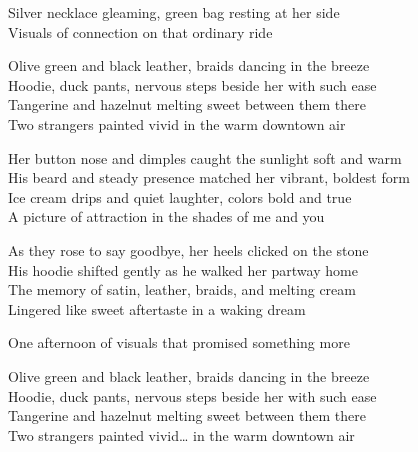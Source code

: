 \begin{lyrics}
Silver necklace gleaming, green bag resting at her side\\
Visuals of connection on that ordinary ride

Olive green and black leather, braids dancing in the breeze\\
Hoodie, duck pants, nervous steps beside her with such ease\\
Tangerine and hazelnut melting sweet between them there\\
Two strangers painted vivid in the warm downtown air

Her button nose and dimples caught the sunlight soft and warm\\
His beard and steady presence matched her vibrant, boldest form\\
Ice cream drips and quiet laughter, colors bold and true\\
A picture of attraction in the shades of me and you

As they rose to say goodbye, her heels clicked on the stone\\
His hoodie shifted gently as he walked her partway home\\
The memory of satin, leather, braids, and melting cream\\
Lingered like sweet aftertaste in a waking dream

One afternoon of visuals that promised something more

Olive green and black leather, braids dancing in the breeze\\
Hoodie, duck pants, nervous steps beside her with such ease\\
Tangerine and hazelnut melting sweet between them there\\
Two strangers painted vivid… in the warm downtown air
\end{lyrics}

